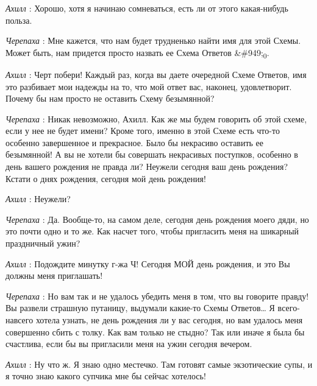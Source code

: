 \documentclass[../main.tex]{subfiles}
\begin{document}
\begin{dialogue}
\emph{Ахилл} : Хорошо, хотя я начинаю сомневаться, есть ли от этого какая-нибудь польза.

\emph{Черепаха} : Мне кажется, что нам будет трудненько найти имя для этой Схемы. Может быть, нам придется просто назвать ее Схема Ответов \&\#949;\textsubscript{0}.

\emph{Ахилл} : Черт побери! Каждый раз, когда вы даете очередной Схеме Ответов, имя это разбивает мои надежды на то, что мой ответ вас, наконец, удовлетворит. Почему бы нам просто не оставить Схему безымянной?

\emph{Черепаха} : Никак невозможно, Ахилл. Как же мы будем говорить об этой схеме, если у нее не будет имени? Кроме того, именно в этой Схеме есть что-то особенно завершенное и прекрасное. Было бы некрасиво оставить ее безымянной! А вы не хотели бы совершать некрасивых поступков, особенно в день вашего рождения не правда ли? Неужели сегодня ваш день рождения? Кстати о днях рождения, сегодня мой день рождения!

\emph{Ахилл} : Неужели?

\emph{Черепаха} : Да. Вообще-то, на самом деле, сегодня день рождения моего дяди, но это почти одно и то же. Как насчет того, чтобы пригласить меня на шикарный праздничный ужин?

\emph{Ахилл} : Подождите минутку г-жа Ч! Сегодня МОЙ день рождения, и это Вы должны меня приглашать!

\emph{Черепаха} : Но вам так и не удалось убедить меня в том, что вы говорите правду! Вы развели страшную путаницу, выдумали какие-то Схемы Ответов\ldots{} Я всего-навсего хотела узнать, не день рождения ли у вас сегодня, но вам удалось меня совершенно сбить с толку. Как вам только не стыдно? Так или иначе я была бы счастлива, если бы вы пригласили меня на ужин сегодня вечером.

\emph{Ахилл} : Ну что ж. Я знаю одно местечко. Там готовят самые экзотические супы, и я точно знаю какого супчика мне бы сейчас хотелось!

\end{dialogue}
\end{document}
